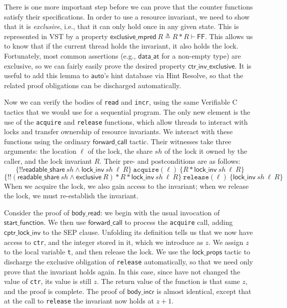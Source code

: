 \documentclass[11pt]{article}
\begin{document}
There is one more important step before we can prove that the counter functions satisfy their specifications. In order to use a resource invariant, we need to show that it is \emph{exclusive}, i.e., that it can only hold once in any given state. This is represented in VST by a property $\mathsf{exclusive\_mpred}\ R \triangleq R * R \vdash \mathsf{FF}$. This allows us to know that if the current thread holds the invariant, it also holds the lock. Fortunately, most common assertions (e.g., $\mathsf{data\_at}$ for a non-empty type) are exclusive, so we can fairly easily prove the desired property $\mathsf{ctr\_inv\_exclusive}$. It is useful to add this lemma to $\mathsf{auto}$'s hint database via \textsf{Hint Resolve}, so that the related proof obligations can be discharged automatically.

Now we can verify the bodies of \texttt{read} and \texttt{incr}, using the same Verifiable C tactics that we would use for a sequential program. The only new element is the use of the \texttt{acquire} and \texttt{release} functions, which allow threads to interact with locks and transfer ownership of resource invariants. We interact with these functions using the ordinary $\mathsf{forward\_call}$ tactic. Their witnesses take three arguments: the location $\ell$ of the lock, the share $\mathit{sh}$ of the lock it owned by the caller, and the lock invariant $R$. Their pre- and postconditions are as follows:
$$\{!!\mathsf{readable\_share}\ \mathit{sh} \land \mathsf{lock\_inv}\ \mathit{sh}\ \ell\ R\}\ \texttt{acquire}(\ell)\ \{R * \mathsf{lock\_inv}\ \mathit{sh}\ \ell\ R\}$$
$$\{!!(\mathsf{readable\_share}\ \mathit{sh} \land \mathsf{exclusive}\ R) * R * \mathsf{lock\_inv}\ \mathit{sh}\ \ell\ R\}\ \texttt{release}(\ell)\ \{\mathsf{lock\_inv}\ \mathit{sh}\ \ell\ R\}$$
When we acquire the lock, we also gain access to the invariant; when we release the lock, we must re-establish the invariant.

Consider the proof of $\mathsf{body\_read}$: we begin with the usual invocation of $\mathsf{start\_function}$. We then use $\mathsf{forward\_call}$ to process the \texttt{acquire} call, adding $\mathsf{cptr\_lock\_inv}$ to the \textsf{SEP} clause. Unfolding its definition tells us that we now have access to \texttt{ctr}, and the integer stored in it, which we introduce as $z$. We assign $z$ to the local variable \texttt{t}, and then release the lock. We use the $\mathsf{lock\_props}$ tactic to discharge the exclusive obligation of \texttt{release} automatically, so that we need only prove that the invariant holds again. In this case, since have not changed the value of \texttt{ctr}, its value is still $z$. The return value of the function is that same $z$, and the proof is complete. The proof of $\mathsf{body\_incr}$ is almost identical, except that at the call to \texttt{release} the invariant now holds at $z + 1$.
\end{document}
